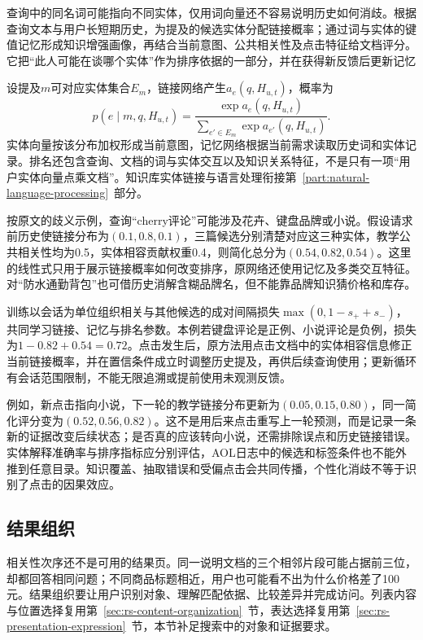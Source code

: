 查询中的同名词可能指向不同实体，仅用词向量还不容易说明历史如何消歧。根据查询文本与用户长短期历史，为提及的候选实体分配链接概率；通过词与实体的键值记忆形成知识增强画像，再结合当前意图、公共相关性及点击特征给文档评分。它把“此人可能在谈哪个实体”作为排序依据的一部分，并在获得新反馈后更新记忆

设提及$m$可对应实体集合$E_m$，链接网络产生$a_e(q,H_{u,t})$，概率为
\begin{equation}
 p(e\mid m,q,H_{u,t})=
 \frac{\exp a_e(q,H_{u,t})}{\sum_{e'\in E_m}\exp a_{e'}(q,H_{u,t})}.
 \label{eq:rs-search-keps-linking}
\end{equation}
实体向量按该分布加权形成当前意图，记忆网络根据当前需求读取历史词和实体记录。排名还包含查询、文档的词与实体交互以及知识关系特征，不是只有一项“用户实体向量点乘文档”。知识库实体链接与语言处理衔接第~\ref{part:natural-language-processing}~部分。

按原文的歧义示例，查询“cherry评论”可能涉及花卉、键盘品牌或小说。假设请求前历史使链接分布为$(0.1,0.8,0.1)$，三篇候选分别清楚对应这三种实体，教学公共相关性均为0.5，实体相容贡献权重0.4，则简化总分为$(0.54,0.82,0.54)$。这里的线性式只用于展示链接概率如何改变排序，原网络还使用记忆及多类交互特征。对“防水通勤背包”也可借历史消解含糊品牌名，但不能靠品牌知识猜价格和库存。

训练以会话为单位组织相关与其他候选的成对间隔损失$\max(0,1-s_++s_-)$，共同学习链接、记忆与排名参数。本例若键盘评论是正例、小说评论是负例，损失为$1-0.82+0.54=0.72$。点击发生后，原方法用点击文档中的实体相容信息修正当前链接概率，并在置信条件成立时调整历史提及，再供后续查询使用；更新循环有会话范围限制，不能无限追溯或提前使用未观测反馈。

例如，新点击指向小说，下一轮的教学链接分布更新为$(0.05,0.15,0.80)$，同一简化评分变为$(0.52,0.56,0.82)$。这不是用后来点击重写上一轮预测，而是记录一条新的证据改变后续状态；是否真的应该转向小说，还需排除误点和历史链接错误。实体解释准确率与排序指标应分别评估，AOL日志中的候选和标签条件也不能外推到任意目录。知识覆盖、抽取错误和受偏点击会共同传播，个性化消歧不等于识别了点击的因果效应。

\subsection{结果组织}
\label{sec:rs-search-organization}

相关性次序还不是可用的结果页。同一说明文档的三个相邻片段可能占据前三位，却都回答相同问题；不同商品标题相近，用户也可能看不出为什么价格差了100元。结果组织要让用户识别对象、理解匹配依据、比较差异并完成访问。列表内容与位置选择复用第~\ref{sec:rs-content-organization}~节，表达选择复用第~\ref{sec:rs-presentation-expression}~节，本节补足搜索中的对象和证据要求。

